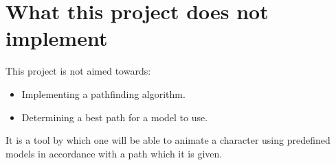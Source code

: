 \section{What this project does not implement}
This project is not aimed towards:
\begin{itemize}
    \item Implementing a pathfinding algorithm.
    \item Determining a best path for a model to use.
\end{itemize}
It is a tool by which one will be able to animate a character using predefined models in accordance with a path which it is given.
